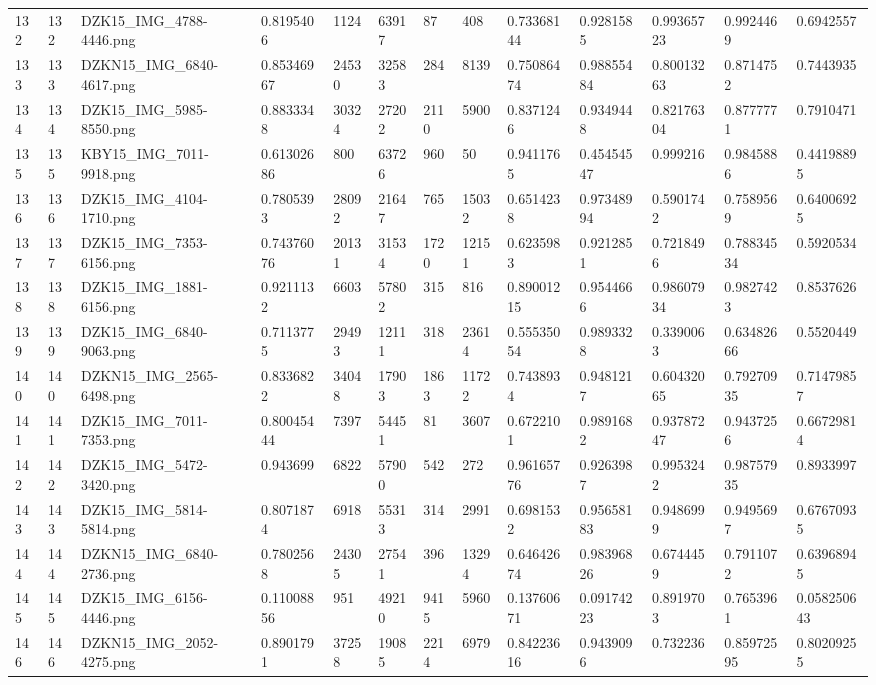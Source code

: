 \documentclass[11pt, a4paper, twoside]{report}
\begin{document}
\begin{longtable}[c]{@{}lllllllllllll@{}}
132 & 132 & DZK15\_IMG\_4788-4446.png & 0.8195406 & 1124 & 63917 & 87 & 408 & 0.73368144 & 0.9281585 & 0.99365723 & 0.9924469 & 0.6942557 \\
133 & 133 & DZKN15\_IMG\_6840-4617.png & 0.85346967 & 24530 & 32583 & 284 & 8139 & 0.75086474 & 0.98855484 & 0.80013263 & 0.8714752 & 0.7443935 \\
134 & 134 & DZK15\_IMG\_5985-8550.png & 0.8833348 & 30324 & 27202 & 2110 & 5900 & 0.8371246 & 0.9349448 & 0.82176304 & 0.8777771 & 0.7910471 \\
135 & 135 & KBY15\_IMG\_7011-9918.png & 0.61302686 & 800 & 63726 & 960 & 50 & 0.9411765 & 0.45454547 & 0.999216 & 0.9845886 & 0.44198895 \\
136 & 136 & DZK15\_IMG\_4104-1710.png & 0.7805393 & 28092 & 21647 & 765 & 15032 & 0.6514238 & 0.97348994 & 0.5901742 & 0.7589569 & 0.64006925 \\
137 & 137 & DZK15\_IMG\_7353-6156.png & 0.74376076 & 20131 & 31534 & 1720 & 12151 & 0.6235983 & 0.9212851 & 0.7218496 & 0.78834534 & 0.5920534 \\
138 & 138 & DZK15\_IMG\_1881-6156.png & 0.9211132 & 6603 & 57802 & 315 & 816 & 0.89001215 & 0.9544666 & 0.98607934 & 0.9827423 & 0.8537626 \\
139 & 139 & DZK15\_IMG\_6840-9063.png & 0.7113775 & 29493 & 12111 & 318 & 23614 & 0.55535054 & 0.9893328 & 0.3390063 & 0.63482666 & 0.5520449 \\
140 & 140 & DZKN15\_IMG\_2565-6498.png & 0.8336822 & 34048 & 17903 & 1863 & 11722 & 0.7438934 & 0.9481217 & 0.60432065 & 0.79270935 & 0.71479857 \\
141 & 141 & DZK15\_IMG\_7011-7353.png & 0.80045444 & 7397 & 54451 & 81 & 3607 & 0.6722101 & 0.9891682 & 0.93787247 & 0.9437256 & 0.66729814 \\
142 & 142 & DZK15\_IMG\_5472-3420.png & 0.943699 & 6822 & 57900 & 542 & 272 & 0.96165776 & 0.9263987 & 0.9953242 & 0.98757935 & 0.8933997 \\
143 & 143 & DZK15\_IMG\_5814-5814.png & 0.8071874 & 6918 & 55313 & 314 & 2991 & 0.6981532 & 0.95658183 & 0.9486999 & 0.9495697 & 0.67670935 \\
144 & 144 & DZKN15\_IMG\_6840-2736.png & 0.7802568 & 24305 & 27541 & 396 & 13294 & 0.64642674 & 0.98396826 & 0.6744459 & 0.7911072 & 0.63968945 \\
145 & 145 & DZK15\_IMG\_6156-4446.png & 0.11008856 & 951 & 49210 & 9415 & 5960 & 0.13760671 & 0.09174223 & 0.8919703 & 0.7653961 & 0.058250643 \\
146 & 146 & DZKN15\_IMG\_2052-4275.png & 0.8901791 & 37258 & 19085 & 2214 & 6979 & 0.84223616 & 0.9439096 & 0.732236 & 0.85972595 & 0.80209255 \\

\end{longtable}
\end{document}
